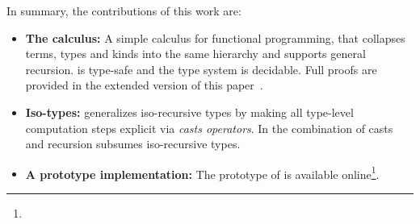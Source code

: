 \begin{comment}
 and there is no type-level
abstraction. In other words in Haskell, mechanisms such as type
classes and type families

Although it may seem that forcing each step of computation 
at the type-level to be explicit will prevent convinient use of 
type-level computation.

Point about the treatment of type-level computation in Haskell. Haskell's
core language has type applications, but no type-level lambda. Equality 
is syntactic modulo alpha-conversion. This design choice was rooted in the 
desire to support Hindley-Milner type-inference... 
\end{comment}

In summary, the contributions of this work are:

\begin{itemize}
\item {\bf The \name calculus:} A simple calculus for functional programming, that collapses terms, types and
  kinds into the same hierarchy and supports general recursion. \name
  is type-safe and the type system is decidable. Full proofs are provided in the extended version of this paper~\cite{full}.

\item {\bf Iso-types:} \name 
 generalizes iso-recursive types by making all type-level computation
 steps explicit via \emph{casts operators}. In \name the combination of
 casts and recursion subsumes iso-recursive types.


\item {\bf A prototype implementation:} The prototype of \name is
  available online\footnote{\fullurl}.
\end{itemize}

